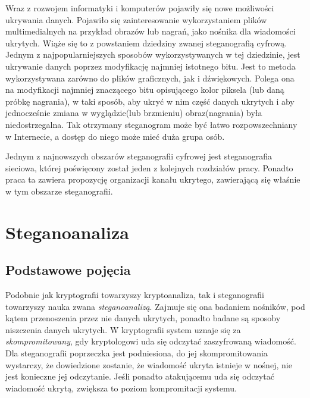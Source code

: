 \documentclass[a4paper, twoside, 12pt]{report}
\begin{document}
        Wraz z rozwojem informatyki i komputerów pojawiły się nowe możliwości
        ukrywania danych. Pojawiło się zainteresowanie wykorzystaniem plików
        multimedialnych na przykład obrazów lub nagrań, jako nośnika dla wiadomości
        ukrytych. Wiąże się to z powstaniem dziedziny zwanej steganografią cyfrową.
        Jednym z najpopularniejszych sposobów wykorzystywanych w tej dziedzinie,
        jest ukrywanie danych poprzez modyfikację najmniej istotnego bitu. Jest
        to metoda wykorzystywana zarówno do plików graficznych\cite{LSBSTEGANGRAPHY},
        jak i dźwiękowych\cite{AUDIOLSBSTEGANGRAPHY}.
        Polega ona na modyfikacji najmniej znaczącego bitu opisującego kolor piksela
        (lub daną próbkę nagrania), w taki sposób, aby ukryć w nim część danych
        ukrytych i aby jednocześnie zmiana w wyglądzie(lub brzmieniu) obraz(nagrania)
        była niedostrzegalna. Tak otrzymany steganogram może być łatwo rozpowszechniany
        w Internecie, a dostęp do niego może mieć duża grupa osób.

        Jednym z najnowszych obszarów steganografii cyfrowej jest steganografia
        sieciowa, której poświęcony został jeden z kolejnych rozdziałów pracy.
        Ponadto praca ta zawiera propozycję organizacji kanału ukrytego, zawierającą
        się właśnie w tym obszarze steganografii.

    \section{Steganoanaliza}
        \subsection{Podstawowe pojęcia}
        Podobnie jak kryptografii towarzyszy kryptoanaliza, tak i steganografii
        towarzyszy nauka zwana \emph{steganoanalizą}. Zajmuje się ona badaniem
        nośników, pod kątem przenoszenia przez nie danych ukrytych, ponadto badane
        są sposoby niszczenia danych ukrytych. W kryptografii system uznaje się
        za \emph{skompromitowany}, gdy kryptologowi uda się odczytać zaszyfrowaną wiadomość.
        Dla steganografii poprzeczka jest podniesiona, do jej skompromitowania wystarczy,
        że dowiedzione zostanie, że wiadomość ukryta istnieje w nośnej, nie jest
        konieczne jej odczytanie. Jeśli ponadto atakującemu uda się odczytać wiadomość
        ukrytą, zwiększa to poziom kompromitacji systemu.
\end{document}
